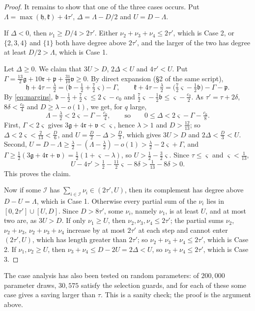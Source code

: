 \documentclass[11pt,colorlinks]{charlie}
\begin{document}
\begin{proof}
It remains to show that one of the three cases occurs. Put $\Lambda=\max(\mathfrak h,\mathfrak k)+4\tau'$, $\Delta=\Lambda-D/2$ and $U=D-\Lambda$.

If $\Delta<0$, then $\nu_1\ge D/4>2\tau'$. Either $\nu_2+\nu_3+\nu_4\le2\tau'$, which is Case 2, or $\{2,3,4\}$ and $\{1\}$ both have degree above $2\tau'$, and the larger of the two has degree at least $D/2>\Lambda$, which is Case 1.

Let $\Delta\ge0$. We claim that $3U>D$, $2\Delta<U$ and $4\tau'<U$. Put $\Gamma=\frac{13}2\mathfrak g+10\mathfrak r+\mathfrak p+\frac{31}{10}\mathfrak v\ge0$. By direct expansion (\S2 of the same script),
\[
 \mathfrak h+4\tau-\tfrac\lambda2=\big(\mathfrak b-\tfrac12+\tfrac72\varsigma\big)-\Gamma,\qquad
 \mathfrak k+4\tau-\tfrac\lambda2=\big(\tfrac72\varsigma-\tfrac12\mathfrak b\big)-\Gamma-\mathfrak p .
\]
By \eqref{eq:margins}, $\mathfrak b-\frac12+\frac72\varsigma\le2\varsigma-c_0$ and $\frac72\varsigma-\frac12\mathfrak b\le\varsigma-\frac{c_0}2$. As $\tau'=\tau+2\delta$, $8\delta<\frac{c_0}4$ and $D\ge\lambda-o(1)$, we get, for $q$ large,
\[
 \Lambda-\tfrac\lambda2<2\varsigma-\Gamma-\tfrac{c_0}4,\qquad\text{so}\qquad 0\le\Delta<2\varsigma-\Gamma-\tfrac{c_0}8 .
\]
First, $\Gamma<2\varsigma$ gives $3\mathfrak g+4\mathfrak r+\mathfrak v<\varsigma$, hence $\lambda>1$ and $D>\frac{12}{13}$; so $\Delta<2\varsigma<\frac2{13}<\frac D6$, and $U=\frac D2-\Delta>\frac D3$, which gives $3U>D$ and $2\Delta<\frac D3<U$. Second, $U=D-\Lambda\ge\frac\lambda2-(\Lambda-\frac\lambda2)-o(1)>\frac\lambda2-2\varsigma+\Gamma$, and $\Gamma\ge\frac12(3\mathfrak g+4\mathfrak r+\mathfrak v)=\frac12(1+\varsigma-\lambda)$, so $U>\frac12-\frac32\varsigma$. Since $\tau\le\varsigma$ and $\varsigma<\frac1{13}$,
\[
 U-4\tau'>\tfrac12-\tfrac{11}2\varsigma-8\delta>\tfrac1{13}-8\delta>0 .
\]
This proves the claim.

Now if some $\mathcal I$ has $\sum_{i\in\mathcal I}\nu_i\in(2\tau',U)$, then its complement has degree above $D-U=\Lambda$, which is Case 1. Otherwise every partial sum of the $\nu_i$ lies in $[0,2\tau']\cup[U,D]$. Since $D>8\tau'$, some $\nu_i$, namely $\nu_1$, is at least $U$, and at most two are, as $3U>D$. If only $\nu_1\ge U$, then $\nu_2,\nu_3,\nu_4\le2\tau'$; the partial sums $\nu_2$, $\nu_2+\nu_3$, $\nu_2+\nu_3+\nu_4$ increase by at most $2\tau'$ at each step and cannot enter $(2\tau',U)$, which has length greater than $2\tau'$; so $\nu_2+\nu_3+\nu_4\le2\tau'$, which is Case 2. If $\nu_1,\nu_2\ge U$, then $\nu_3+\nu_4\le D-2U=2\Delta<U$, so $\nu_3+\nu_4\le2\tau'$, which is Case 3.
\end{proof}
\noindent The case analysis has also been tested on random parameters: of $200{,}000$ parameter draws, $30{,}575$ satisfy the selection guards, and for each of these some case gives a saving larger than $\tau$. This is a sanity check; the proof is the argument above.
\end{document}

